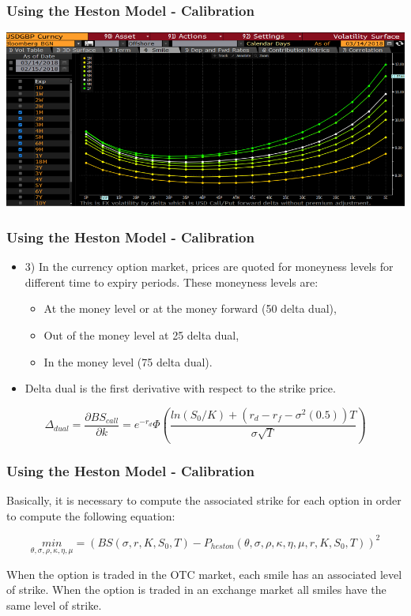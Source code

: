 \documentclass[12pt]{beamer}
\begin{document}
\begin{frame}
\frametitle{Using the Heston Model - Calibration}
\centering
\includegraphics[width=\textwidth]{bloomberg2.png}
\end{frame}

\begin{frame}
\frametitle{Using the Heston Model - Calibration}
\begin{itemize}
  \item 3)	In the currency option market, prices are quoted for moneyness levels for different time to expiry periods. These moneyness levels are:
  \begin{itemize}
    \item At the money level or at the money forward (50 delta dual),
    \item Out of the money level at 25 delta dual,
    \item In the money level (75 delta dual).
  \end{itemize}
  \item Delta dual is the first derivative with respect to the strike price.
\end{itemize}
$$\Delta_{dual}=\frac{\partial BS_{call}}{\partial k}=e^{-r_{d}}\Phi \left(\frac{ln(S_{0}/K)+(r_{d}-r_{f}-\sigma^{2}(0.5))T}{\sigma \sqrt T}\right)$$
\end{frame}


\begin{frame}
\frametitle{Using the Heston Model - Calibration}
Basically, it is necessary to compute the associated strike for each option in order to compute the following equation:

$$\underset{\theta,\sigma,\rho,\kappa,\eta,\mu}{min}=(BS(\sigma,r,K,S_{0},T)-P_{heston}(\theta,\sigma,\rho,\kappa,\eta,\mu,r,K,S_{0},T))^2$$

When the option is traded in the OTC market, each smile has an associated level of strike. When the option is traded in an exchange market all smiles have the same level of strike.
\end{frame}
\end{document}
